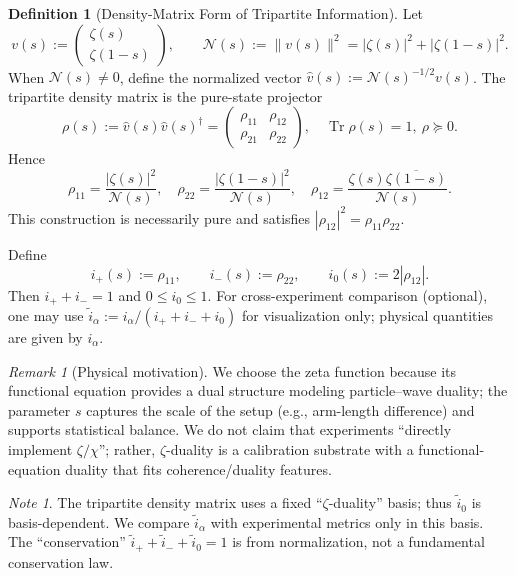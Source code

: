 \documentclass[11pt]{article}
\theoremstyle{definition}
\newtheorem{definition}[theorem]{Definition}
\theoremstyle{remark}
\newtheorem{remark}[theorem]{Remark}
\newtheorem*{note}{Note}
\DeclareMathOperator{\Tr}{Tr}
\begin{document}
\begin{definition}[Density-Matrix Form of Tripartite Information]\label{def:tripartite}
Let
\[
v(s):=\begin{pmatrix} \zeta(s) \\ \zeta(1-s) \end{pmatrix},\qquad \mathcal{N}(s):=\lVert v(s)\rVert^2 = |\zeta(s)|^2 + |\zeta(1-s)|^2.
\]
When \( \mathcal{N}(s)\neq 0 \), define the normalized vector \( \hat v(s):=\mathcal{N}(s)^{-1/2} v(s) \). The tripartite density matrix is the pure-state projector
\[
\rho(s):=\hat v(s)\hat v(s)^\dagger =
\begin{pmatrix}
\rho_{11} & \rho_{12} \\
\rho_{21} & \rho_{22}
\end{pmatrix},\quad \Tr\rho(s)=1,\ \rho\succeq 0.
\]
Hence
\[
\rho_{11}=\frac{|\zeta(s)|^2}{\mathcal{N}(s)},\quad
\rho_{22}=\frac{|\zeta(1-s)|^2}{\mathcal{N}(s)},\quad
\rho_{12}=\frac{\zeta(s)\overline{\zeta(1-s)}}{\mathcal{N}(s)}.
\]
This construction is necessarily pure and satisfies \( |\rho_{12}|^2=\rho_{11}\rho_{22} \).

Define
\[
i_+(s):=\rho_{11},\qquad
i_-(s):=\rho_{22},\qquad
i_0(s):=2|\rho_{12}|.
\]
Then \( i_+ + i_- = 1 \) and \( 0\le i_0\le 1 \). For cross-experiment comparison (optional), one may use \( \tilde i_\alpha := i_\alpha/(i_+ + i_- + i_0) \) for visualization only; physical quantities are given by \( i_\alpha \).
\end{definition}

\begin{remark}[Physical motivation]
We choose the zeta function because its functional equation provides a dual structure modeling particle--wave duality; the parameter \( s \) captures the scale of the setup (e.g., arm-length difference) and supports statistical balance. We do not claim that experiments ``directly implement \( \zeta/\chi \)''; rather, \( \zeta \)-duality is a calibration substrate with a functional-equation duality that fits coherence/duality features.
\end{remark}

\begin{note}
The tripartite density matrix uses a fixed ``\( \zeta \)-duality'' basis; thus \( \tilde i_0 \) is basis-dependent. We compare \( \tilde i_\alpha \) with experimental metrics only in this basis. The ``conservation'' \( \tilde i_+ + \tilde i_- + \tilde i_0=1 \) is from normalization, not a fundamental conservation law.
\end{note}
\end{document}
